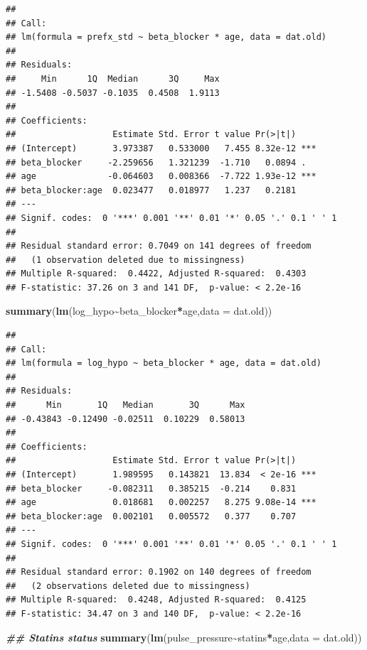 \documentclass[
]{article}
\newenvironment{Shaded}{\begin{snugshade}}{\end{snugshade}}
\newcommand{\AttributeTok}[1]{\textcolor[rgb]{0.13,0.29,0.53}{#1}}
\newcommand{\DocumentationTok}[1]{\textcolor[rgb]{0.56,0.35,0.01}{\textbf{\textit{#1}}}}
\newcommand{\FunctionTok}[1]{\textcolor[rgb]{0.13,0.29,0.53}{\textbf{#1}}}
\newcommand{\NormalTok}[1]{#1}
\newcommand{\SpecialCharTok}[1]{\textcolor[rgb]{0.81,0.36,0.00}{\textbf{#1}}}
\begin{document}
\begin{verbatim}
## 
## Call:
## lm(formula = prefx_std ~ beta_blocker * age, data = dat.old)
## 
## Residuals:
##     Min      1Q  Median      3Q     Max 
## -1.5408 -0.5037 -0.1035  0.4508  1.9113 
## 
## Coefficients:
##                   Estimate Std. Error t value Pr(>|t|)    
## (Intercept)       3.973387   0.533000   7.455 8.32e-12 ***
## beta_blocker     -2.259656   1.321239  -1.710   0.0894 .  
## age              -0.064603   0.008366  -7.722 1.93e-12 ***
## beta_blocker:age  0.023477   0.018977   1.237   0.2181    
## ---
## Signif. codes:  0 '***' 0.001 '**' 0.01 '*' 0.05 '.' 0.1 ' ' 1
## 
## Residual standard error: 0.7049 on 141 degrees of freedom
##   (1 observation deleted due to missingness)
## Multiple R-squared:  0.4422, Adjusted R-squared:  0.4303 
## F-statistic: 37.26 on 3 and 141 DF,  p-value: < 2.2e-16
\end{verbatim}

\begin{Shaded}
\begin{Highlighting}[]
\FunctionTok{summary}\NormalTok{(}\FunctionTok{lm}\NormalTok{(log\_hypo}\SpecialCharTok{\textasciitilde{}}\NormalTok{beta\_blocker}\SpecialCharTok{*}\NormalTok{age,}\AttributeTok{data =}\NormalTok{ dat.old))}
\end{Highlighting}
\end{Shaded}

\begin{verbatim}
## 
## Call:
## lm(formula = log_hypo ~ beta_blocker * age, data = dat.old)
## 
## Residuals:
##      Min       1Q   Median       3Q      Max 
## -0.43843 -0.12490 -0.02511  0.10229  0.58013 
## 
## Coefficients:
##                   Estimate Std. Error t value Pr(>|t|)    
## (Intercept)       1.989595   0.143821  13.834  < 2e-16 ***
## beta_blocker     -0.082311   0.385215  -0.214    0.831    
## age               0.018681   0.002257   8.275 9.08e-14 ***
## beta_blocker:age  0.002101   0.005572   0.377    0.707    
## ---
## Signif. codes:  0 '***' 0.001 '**' 0.01 '*' 0.05 '.' 0.1 ' ' 1
## 
## Residual standard error: 0.1902 on 140 degrees of freedom
##   (2 observations deleted due to missingness)
## Multiple R-squared:  0.4248, Adjusted R-squared:  0.4125 
## F-statistic: 34.47 on 3 and 140 DF,  p-value: < 2.2e-16
\end{verbatim}

\begin{Shaded}
\begin{Highlighting}[]
\DocumentationTok{\#\# Statins status}
\FunctionTok{summary}\NormalTok{(}\FunctionTok{lm}\NormalTok{(pulse\_pressure}\SpecialCharTok{\textasciitilde{}}\NormalTok{statins}\SpecialCharTok{*}\NormalTok{age,}\AttributeTok{data =}\NormalTok{ dat.old))}
\end{Highlighting}
\end{Shaded}
\end{document}
